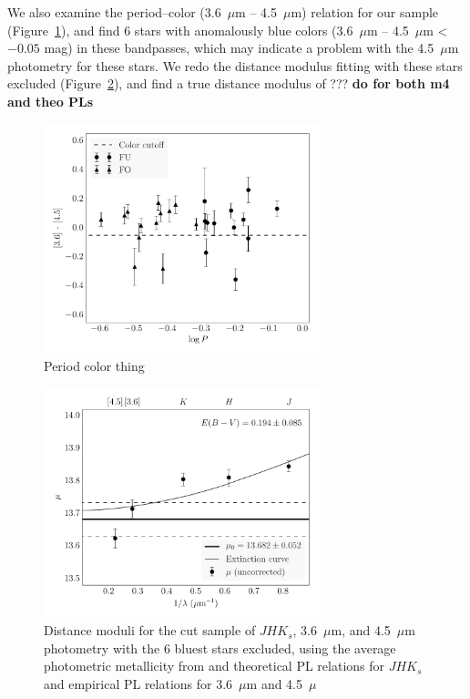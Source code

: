 \documentclass[a4paper,fleqn,usenatbib]{mnras}
\begin{document}
We also examine the period--color (3.6~$\mu$m -- 4.5~$\mu$m) relation for our sample (Figure~\ref{fig:period_color}), and find 6 stars with anomalously blue colors (3.6~$\mu$m -- 4.5~$\mu$m < $-0.05$ mag) in these bandpasses, which may indicate a problem with the 4.5~$\mu$m photometry for these stars. We redo the distance modulus fitting with these stars excluded (Figure~\ref{fig:omegaCen_dist_trimmed}), and find a true distance modulus of ??? {\bf do for both m4 and theo PLs}

\begin{figure}
\begin{center}
\includegraphics[width=80mm]{final_plots/period_color_samestars.pdf}
\caption{Period color thing} %
\label{fig:period_color}
\end{center}
\end{figure}

\begin{figure}
\begin{center}
\includegraphics[width=80mm]{final_plots/multiwavelength_distance_samestars_trimmed.pdf}
\caption{Distance moduli for the cut sample of $J\!H\!K_s$, 3.6~$\mu$m, and 4.5~$\mu$m photometry with the 6 bluest stars excluded, using the average photometric metallicity from \citet{2006ApJ...640L..43S} and theoretical PL relations for $J\!H\!K_s$ and empirical PL relations for 3.6~$\mu$m and 4.5~$\mu$
}
\label{fig:omegaCen_dist_trimmed}
\end{center}
\end{figure}
\end{document}
